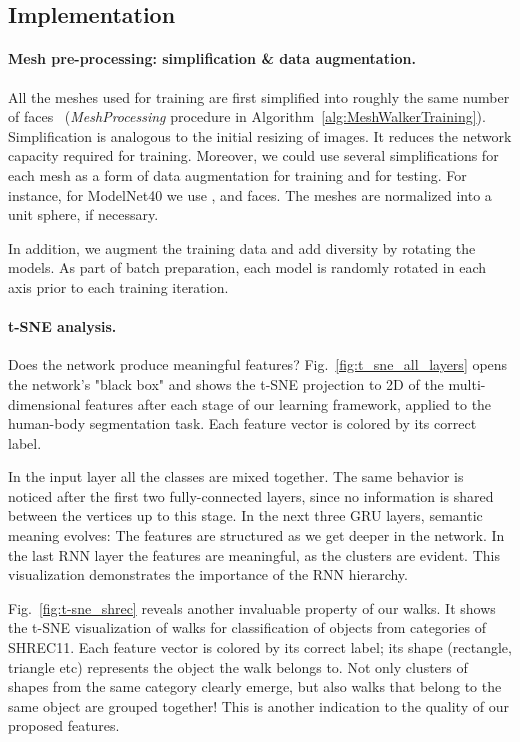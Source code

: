 \documentclass[acmtog]{acmart}
\begin{document}
\subsection{Implementation}
\label{subsec:implementation}

\paragraph{Mesh pre-processing: simplification \& data augmentation.}
\label{subsec:preprocessing}
All the meshes used for training are first simplified into roughly the same number of faces~\cite{garland1997surface, hoppe1997view} ({\em MeshProcessing} procedure in Algorithm~\ref{alg:MeshWalkerTraining}).
Simplification is analogous to the initial resizing of images.
It reduces the network capacity required for training. 
Moreover, we could use several simplifications for each mesh as a form of data augmentation for training and for testing. 
For instance, for ModelNet40 we use ,  and  faces.
The meshes are normalized into a unit sphere, if necessary.


In addition, we augment the training data and add diversity by rotating the models. 
As part of batch preparation, each model is randomly rotated in each  axis prior to each training iteration.


\paragraph{t-SNE analysis.}
Does the network produce meaningful features?  
Fig.~\ref{fig:t_sne_all_layers} opens the network's "black box" and shows the t-SNE  projection to 2D of the multi-dimensional features after each stage of our learning framework, applied to the human-body segmentation task.
Each feature vector is colored by its correct label. 

In the input layer all the classes are mixed together. 
The same behavior is noticed after the first two fully-connected layers, since no information is shared between the vertices up to this stage. 
In the next three GRU layers, semantic meaning evolves:
The features are structured as we get deeper in the network.
In the last RNN layer the features are meaningful, as the clusters are evident. 
This visualization demonstrates the importance of the RNN hierarchy.


Fig.~\ref{fig:t-sne_shrec} reveals another invaluable property of our walks.
It shows the t-SNE visualization of walks for classification of objects from  categories of  SHREC11.
Each feature vector is colored by its correct label; its shape (rectangle, triangle etc) represents the object the walk belongs to.
Not only clusters of shapes from the same category clearly emerge, but also walks that belong to the same object are grouped together!
This is another indication to the quality of our proposed features.
\end{document}

